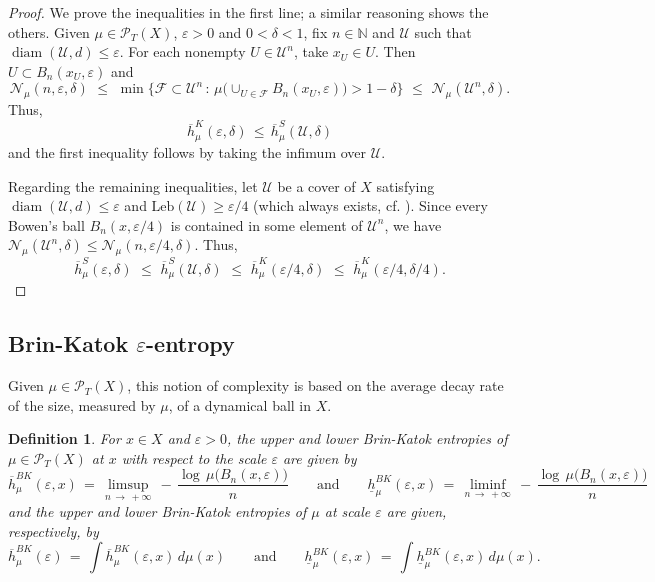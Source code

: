 \documentclass[11pt,a4paper,reqno]{amsart}
\theoremstyle{plain}
\theoremstyle{definition}
\newtheorem{definition}[theorem]{Definition}
\newcommand{\field}[1]{\mathbb{#1}}
\newcommand{\NN}{\field{N}}
\newcommand{\ep} {\varepsilon}
\newcommand{\vep}{\varepsilon}
\newcommand{\cF}{{\mathcal F}}
\newcommand{\cP}{{\mathcal P}}
\newcommand{\cU}{{\mathcal U}}
\newcommand{\cN}{{\mathcal N}}
\newcommand{\diam}{\operatorname{{diam}}}
\begin{document}
\begin{proof}
We prove the inequalities in the first line; a similar reasoning shows the others. Given $\mu\in\cP_T(X)$, $\ep>0$ and $0 < \delta < 1$, fix $n\in\NN$ and $\cU$ such that $\diam(\cU,d)\leq\ep$. For each nonempty $U\in\cU^n$, take $x_U\in U$. Then $U\subset B_n(x_U,\ep)$ and $$\cN_\mu(n,\ep,\delta)\,\,\leq\,\,\min\big\{\cF\subset\cU^n\,\colon\,\mu\big(\cup_{U\in\cF }B_n(x_U,\ep)\big)>1-\delta\big\}\,\,\leq\,\,\cN_\mu(\cU^n,\delta).$$
Thus, 
$$\overline{h}_\mu^K(\vep, \delta)\,\leq\,\overline{h}_\mu^S(\cU, \delta)$$ 
and the first inequality follows by taking the infimum over $\cU.$ 
\smallskip

Regarding the remaining inequalities, let $\cU$ be a cover of $X$ satisfying $\diam(\cU,d)\leq\ep$ and $\mathrm{Leb}(\cU)\geq\ep/4$ (which always exists, cf. \cite[Lemma 3.4]{GS}). Since every Bowen's ball $B_n(x,\ep/4)$ is contained in some element of $\cU^n$, we have $\cN_\mu(\cU^n,\delta)\leq \cN_\mu(n,\ep/4,\delta)$. Thus, $$\overline{h}_\mu^S(\ep, \delta)\,\,\leq\,\,\overline{h}_\mu^S(\cU, \delta)\,\,\leq\,\,\overline{h}_\mu^K(\vep/4, \delta)\,\,\leq\,\,\overline{h}_\mu^K(\ep/4,\delta/4).$$
\end{proof}


\subsection{Brin-Katok $\vep$-entropy}

Given $\mu \in \cP_T(X)$, this notion of complexity is based on the average decay rate of the size, measured by $\mu$, of a dynamical ball in $X$. 
    
\begin{definition}\label{def:Brin-Katok}
\emph{ For $x\in X$ and $\ep>0$, the \emph{upper} and \emph{lower Brin-Katok entropies of $\mu \in \cP_T(X)$ at $x$ with respect to the scale $\ep$} are given by $$\overline{h}^{BK}_\mu(\ep,x)\,=\, \limsup_{n \, \to \, +\infty}\, -\,\frac{\log \, \mu\big(B_n(x,\ep)\big)}{n}\qquad\text{and}\qquad \underline{h}^{BK}_\mu(\ep,x)\,=\, \liminf_{n \, \to \, +\infty}\, -\,\frac{\log \, \mu\big(B_n(x,\ep)\big)}{n}$$
and the \emph{upper} and \emph{lower Brin-Katok entropies of $\mu$ at scale $\ep$} are given, respectively, by $$\overline{h}^{BK}_\mu(\ep)\,=\, \int\overline{h}^{BK}_\mu(\ep,x)\,d\mu(x)\qquad\text{and}\qquad \underline{h}^{BK}_\mu(\ep,x)\,=\, \int\underline{h}^{BK}_\mu(\ep,x)\,d\mu(x).$$}
\end{definition}
\end{document}
